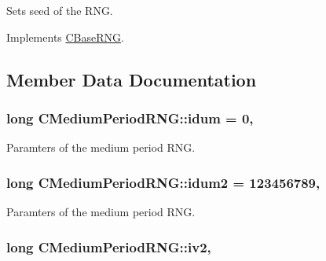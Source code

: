 Sets seed of the R\-N\-G. 



Implements \hyperlink{class_c_base_r_n_g_a56fbf75ca07b73954596ee04820e0b07}{C\-Base\-R\-N\-G}.



\subsection{Member Data Documentation}
\hypertarget{class_c_medium_period_r_n_g_aae9ed6044330aabad8e3571ac483800d}{
\subsubsection[{idum}]{\setlength{\rightskip}{0pt plus 5cm}long C\-Medium\-Period\-R\-N\-G\-::idum = 0\hspace{0.3cm}{\ttfamily [static]}, {\ttfamily [private]}}}\label{class_c_medium_period_r_n_g_aae9ed6044330aabad8e3571ac483800d}


Paramters of the medium period R\-N\-G. 

\hypertarget{class_c_medium_period_r_n_g_a15dda956071d7e8874502761029e37ed}{
\subsubsection[{idum2}]{\setlength{\rightskip}{0pt plus 5cm}long C\-Medium\-Period\-R\-N\-G\-::idum2 = 123456789\hspace{0.3cm}{\ttfamily [static]}, {\ttfamily [private]}}}\label{class_c_medium_period_r_n_g_a15dda956071d7e8874502761029e37ed}


Paramters of the medium period R\-N\-G. 

\hypertarget{class_c_medium_period_r_n_g_ad6be479584d3d21455f253a8254221c4}{
\subsubsection[{iv2}]{\setlength{\rightskip}{0pt plus 5cm}long C\-Medium\-Period\-R\-N\-G\-::iv2\hspace{0.3cm}{\ttfamily [static]}, {\ttfamily [private]}}}\label{class_c_medium_period_r_n_g_ad6be479584d3d21455f253a8254221c4}


